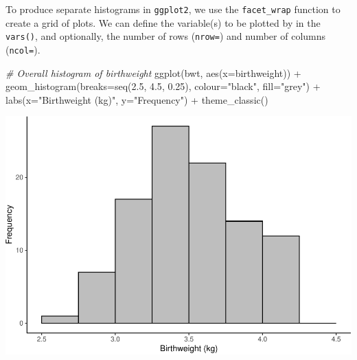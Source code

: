 \documentclass[
]{memoir}
\newenvironment{Shaded}{\begin{snugshade}}{\end{snugshade}}
\newcommand{\AttributeTok}[1]{\textcolor[rgb]{0.77,0.63,0.00}{#1}}
\newcommand{\CommentTok}[1]{\textcolor[rgb]{0.56,0.35,0.01}{\textit{#1}}}
\newcommand{\FloatTok}[1]{\textcolor[rgb]{0.00,0.00,0.81}{#1}}
\newcommand{\FunctionTok}[1]{\textcolor[rgb]{0.00,0.00,0.00}{#1}}
\newcommand{\NormalTok}[1]{#1}
\newcommand{\SpecialCharTok}[1]{\textcolor[rgb]{0.00,0.00,0.00}{#1}}
\newcommand{\StringTok}[1]{\textcolor[rgb]{0.31,0.60,0.02}{#1}}
\begin{document}
To produce separate histograms in \texttt{ggplot2}, we use the \texttt{facet\_wrap} function to create a grid of plots. We can define the variable(s) to be plotted by in the \texttt{vars()}, and optionally, the number of rows (\texttt{nrow=}) and number of columns (\texttt{ncol=}).

\begin{Shaded}
\begin{Highlighting}[]
\CommentTok{\# Overall histogram of birthweight}
\FunctionTok{ggplot}\NormalTok{(bwt, }\FunctionTok{aes}\NormalTok{(}\AttributeTok{x=}\NormalTok{birthweight)) }\SpecialCharTok{+} 
  \FunctionTok{geom\_histogram}\NormalTok{(}\AttributeTok{breaks=}\FunctionTok{seq}\NormalTok{(}\FloatTok{2.5}\NormalTok{, }\FloatTok{4.5}\NormalTok{, }\FloatTok{0.25}\NormalTok{), }\AttributeTok{colour=}\StringTok{"black"}\NormalTok{, }\AttributeTok{fill=}\StringTok{"grey"}\NormalTok{) }\SpecialCharTok{+} 
  \FunctionTok{labs}\NormalTok{(}\AttributeTok{x=}\StringTok{"Birthweight (kg)"}\NormalTok{, }\AttributeTok{y=}\StringTok{"Frequency"}\NormalTok{) }\SpecialCharTok{+}
  \FunctionTok{theme\_classic}\NormalTok{()}
\end{Highlighting}
\end{Shaded}

\includegraphics{phcm9795-R-notes_files/figure-latex/unnamed-chunk-69-1.pdf}
\end{document}
